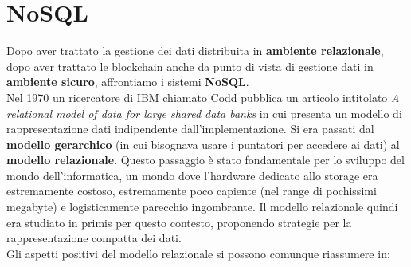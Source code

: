 \documentclass[a4paper,12pt, oneside]{book}
\begin{document}
\chapter{NoSQL}
Dopo aver trattato la gestione dei dati distribuita in \textbf{ambiente
  relazionale}, dopo aver trattato le blockchain anche da punto di vista di
gestione dati in \textbf{ambiente sicuro}, affrontiamo i sistemi
\textbf{NoSQL}.\\
Nel 1970 un ricercatore di IBM chiamato Codd pubblica un articolo intitolato
\textit{A relational model of data for large shared data banks} in cui presenta
un modello di rappresentazione dati indipendente dall'implementazione. Si era
passati dal \textbf{modello gerarchico} (in cui bisognava usare i puntatori per
accedere ai dati) al \textbf{modello relazionale}. Questo passaggio è stato
fondamentale per lo sviluppo del mondo dell'informatica, un mondo dove
l'hardware dedicato allo storage era estremamente costoso, estremamente poco
capiente (nel range di pochissimi megabyte) e logisticamente parecchio
ingombrante. Il modello relazionale quindi era studiato in primis per questo
contesto, proponendo strategie per la rappresentazione compatta dei dati.\\
Gli aspetti positivi del modello relazionale si possono comunque riassumere in:
\end{document}

